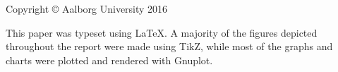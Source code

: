 \thispagestyle{empty}
{\small
\strut\vfill
\noindent Copyright \copyright{} Aalborg University 2016\par
\vspace{0.2cm}
\noindent This paper was typeset using \LaTeX. A majority of the figures depicted throughout the report were made using TikZ, while most of the graphs and charts were plotted and rendered with Gnuplot.}
\clearpage